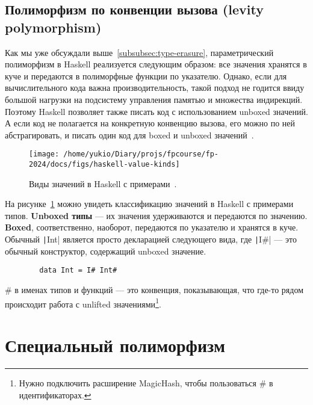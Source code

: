 \documentclass[12pt]{article}
\newcommand{\vocab}[1]{\textbf{#1}} %
\begin{document}
    \subsection{Полиморфизм по конвенции вызова (levity polymorphism)} \label{subsec:levity-polymorphism}

    Как мы уже обсуждали выше~\ref{subsubsec:type-erasure}, параметрический полиморфизм в Haskell реализуется следующим образом: все значения хранятся в куче и передаются в полиморфные функции по указателю.
    Однако, если для вычислительного кода важна производительность, такой подход не годится ввиду большой нагрузки на подсистему управления памятью и множества индирекций.
    Поэтому Haskell позволяет также писать код с использованием unboxed значений.
    А если код не полагается на конкретную конвенцию вызова, его можно по ней абстрагировать, и писать один код для boxed и unboxed значений~\cite{eisenberg2017levity}.

    \begin{figure}[h]
        \centering
        \texttt{[image: /home/yukio/Diary/projs/fpcourse/fp-2024/docs/figs/haskell-value-kinds]}
        \caption{Виды значений в Haskell с примерами~\cite{eisenberg2017levity}.}
        \label{fig:haskell-value-kinds}
    \end{figure}

    На рисунке~\ref{fig:haskell-value-kinds} можно увидеть классификацию значений в Haskell с примерами типов.
    \vocab{Unboxed типы} --- их значения удерживаются и передаются по значению.
    \vocab{Boxed}, соответственно, наоборот, передаются по указателю и хранятся в куче.
    Обычный \texttt|Int| является просто декларацией следующего вида, где \texttt|I#| --- это обычный конструктор, содержащий unboxed значение.
    \begin{verbatim}
        data Int = I# Int#
    \end{verbatim}


    \# в именах типов и функций --- это конвенция, показывающая, что где-то рядом происходит работа с unlifted значениями\footnote{Нужно подключить расширение MagicHash, чтобы пользоваться \# в идентификаторах.}.






    \section{Специальный полиморфизм} \label{sec:ad-hoc}
\end{document}
